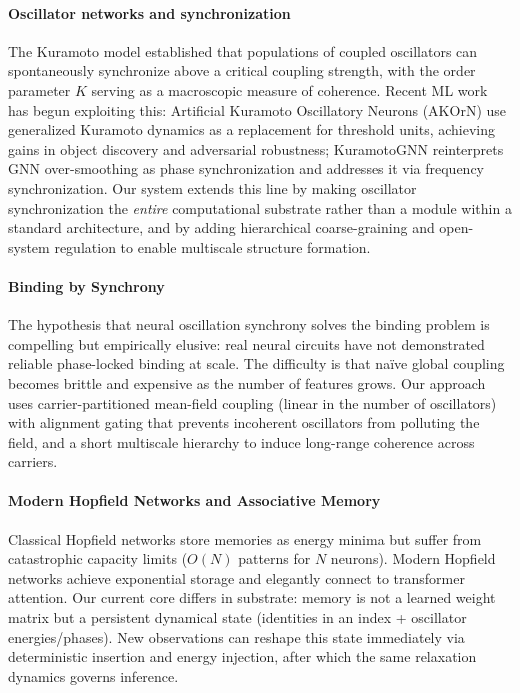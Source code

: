 \documentclass[11pt,a4paper]{article}
\begin{document}
\paragraph{Oscillator networks and synchronization}
The Kuramoto model \citep{kuramoto1984chemical, strogatz2000kuramoto, acebron2005kuramoto} established that populations of coupled oscillators can spontaneously synchronize above a critical coupling strength, with the order parameter $K$ serving as a macroscopic measure of coherence. Recent ML work has begun exploiting this: Artificial Kuramoto Oscillatory Neurons (AKOrN) \citep{frank2024akorn} use generalized Kuramoto dynamics as a replacement for threshold units, achieving gains in object discovery and adversarial robustness; KuramotoGNN \citep{nguyen2024kuramotognn} reinterprets GNN over-smoothing as phase synchronization and addresses it via frequency synchronization. Our system extends this line by making oscillator synchronization the \emph{entire} computational substrate rather than a module within a standard architecture, and by adding hierarchical coarse-graining and open-system regulation to enable multiscale structure formation.

\paragraph{Binding by Synchrony}
The hypothesis that neural oscillation synchrony solves the binding problem \citep{singer1999neuronal, engel2001dynamic, wang2010neurophysiological} is compelling but empirically elusive: real neural circuits have not demonstrated reliable phase-locked binding at scale. The difficulty is that naïve global coupling becomes brittle and expensive as the number of features grows. Our approach uses carrier-partitioned mean-field coupling (linear in the number of oscillators) with alignment gating that prevents incoherent oscillators from polluting the field, and a short multiscale hierarchy to induce long-range coherence across carriers.

\paragraph{Modern Hopfield Networks and Associative Memory}
Classical Hopfield networks \citep{hopfield1982neural} store memories as energy minima but suffer from catastrophic capacity limits ($O(N)$ patterns for $N$ neurons). Modern Hopfield networks \citep{ramsauer2021hopfield} achieve exponential storage and elegantly connect to transformer attention. Our current core differs in substrate: memory is not a learned weight matrix but a persistent dynamical state (identities in an index + oscillator energies/phases). New observations can reshape this state immediately via deterministic insertion and energy injection, after which the same relaxation dynamics governs inference.
\end{document}
